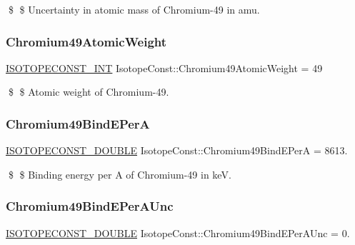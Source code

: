 \$ \$ Uncertainty in atomic mass of Chromium-\/49 in amu. \mbox{\label{group___isotope_const-_chromium-_cr49_gafac74e7033499892b2186da262e7a357}} 
\subsubsection{\texorpdfstring{Chromium49\+Atomic\+Weight}{Chromium49AtomicWeight}}
{\footnotesize\ttfamily \mbox{\hyperlink{group___isotope_const-_macros_ga5f18360b3e99483a35c32d789e62621c}{I\+S\+O\+T\+O\+P\+E\+C\+O\+N\+S\+T\+\_\+\+I\+NT}} Isotope\+Const\+::\+Chromium49\+Atomic\+Weight = 49}

\$ \$ Atomic weight of Chromium-\/49. \mbox{\label{group___isotope_const-_chromium-_cr49_gaff074e9822f96c30e2375015a5e98539}} 
\subsubsection{\texorpdfstring{Chromium49\+Bind\+E\+PerA}{Chromium49BindEPerA}}
{\footnotesize\ttfamily \mbox{\hyperlink{group___isotope_const-_macros_ga8f45a7272ce02c0b4c65c44636ed719a}{I\+S\+O\+T\+O\+P\+E\+C\+O\+N\+S\+T\+\_\+\+D\+O\+U\+B\+LE}} Isotope\+Const\+::\+Chromium49\+Bind\+E\+PerA = 8613.}

\$ \$ Binding energy per A of Chromium-\/49 in keV. \mbox{\label{group___isotope_const-_chromium-_cr49_gaea1bf19d42fb24076edff78d63d32904}} 
\subsubsection{\texorpdfstring{Chromium49\+Bind\+E\+Per\+A\+Unc}{Chromium49BindEPerAUnc}}
{\footnotesize\ttfamily \mbox{\hyperlink{group___isotope_const-_macros_ga8f45a7272ce02c0b4c65c44636ed719a}{I\+S\+O\+T\+O\+P\+E\+C\+O\+N\+S\+T\+\_\+\+D\+O\+U\+B\+LE}} Isotope\+Const\+::\+Chromium49\+Bind\+E\+Per\+A\+Unc = 0.}

